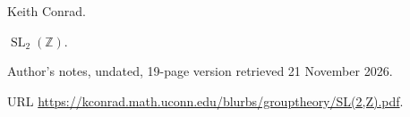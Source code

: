 Keith Conrad.

\newblock $\operatorname{SL}_2(\mathbb Z)$.

\newblock Author's notes, undated, 19-page version retrieved
  21 November 2026.

\newblock URL
  \url{https://kconrad.math.uconn.edu/blurbs/grouptheory/SL(2,Z).pdf}.

